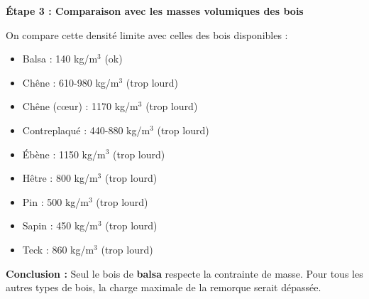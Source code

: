 \documentclass[a4paper,12pt]{article}
\begin{document}
\textbf{Étape 3 : Comparaison avec les masses volumiques des bois}

On compare cette densité limite avec celles des bois disponibles :
\begin{itemize}
    \item Balsa : 140 kg/m$^3$ (ok)
    \item Chêne : 610-980 kg/m$^3$ (trop lourd)
    \item Chêne (cœur) : 1170 kg/m$^3$ (trop lourd)
    \item Contreplaqué : 440-880 kg/m$^3$ (trop lourd)
    \item Ébène : 1150 kg/m$^3$ (trop lourd)
    \item Hêtre : 800 kg/m$^3$ (trop lourd)
    \item Pin : 500 kg/m$^3$ (trop lourd)
    \item Sapin : 450 kg/m$^3$ (trop lourd)
    \item Teck : 860 kg/m$^3$ (trop lourd)
\end{itemize}

\textbf{Conclusion :} Seul le bois de \textbf{balsa} respecte la contrainte de masse. Pour tous les autres types de bois, la charge maximale de la remorque serait dépassée.
\end{document}
